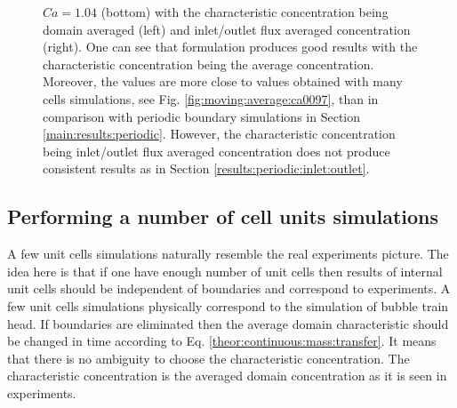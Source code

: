 \documentclass{article}
\begin{document}
\begin{figure}
{$Ca=1.04$ (bottom) with the characteristic concentration being domain
averaged (left) and inlet/outlet flux averaged concentration (right). One can
see that \citet{vanbaten-circular} formulation produces good results with the characteristic concentration being
the average concentration. Moreover, the values are more close to values obtained with many cells
simulations, see Fig. \ref{fig:moving:average:ca0097}, than in comparison with periodic boundary
simulations in Section \ref{main:results:periodic}. However, the characteristic concentration
being inlet/outlet flux averaged concentration does not produce consistent results as in Section
\ref{results:periodic:inlet:outlet}.
\label{fig:vanbaten}}
\end{figure}


\subsection{Performing a number of cell units simulations}
A few unit cells simulations naturally resemble the real experiments picture.  The idea here is
that if one have enough number of unit cells then results of internal unit cells should be
independent of boundaries and correspond to experiments. A few unit cells simulations physically
correspond to the simulation of bubble train head. If boundaries are eliminated then the average
domain characteristic should be changed in time according to Eq.
\ref{theor:continuous:mass:transfer}. It means that there is no ambiguity to choose the
characteristic concentration. The characteristic concentration is the averaged domain concentration
as it is seen in experiments.
\end{document}

